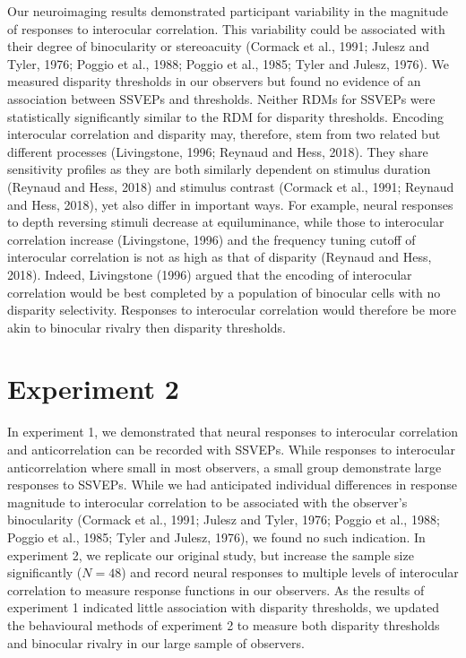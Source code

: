 \documentclass[
  12pt,
]{article}
\begin{document}
Our neuroimaging results demonstrated participant variability in the
magnitude of responses to interocular correlation. This variability
could be associated with their degree of binocularity or stereoacuity
(Cormack et al., 1991; Julesz and Tyler, 1976; Poggio et al., 1988;
Poggio et al., 1985; Tyler and Julesz, 1976). We measured disparity
thresholds in our observers but found no evidence of an association
between SSVEPs and thresholds. Neither RDMs for SSVEPs were
statistically significantly similar to the RDM for disparity thresholds.
Encoding interocular correlation and disparity may, therefore, stem from
two related but different processes (Livingstone, 1996; Reynaud and
Hess, 2018). They share sensitivity profiles as they are both similarly
dependent on stimulus duration (Reynaud and Hess, 2018) and stimulus
contrast (Cormack et al., 1991; Reynaud and Hess, 2018), yet also differ
in important ways. For example, neural responses to depth reversing
stimuli decrease at equiluminance, while those to interocular
correlation increase (Livingstone, 1996) and the frequency tuning cutoff
of interocular correlation is not as high as that of disparity (Reynaud
and Hess, 2018). Indeed, Livingstone (1996) argued that the encoding of
interocular correlation would be best completed by a population of
binocular cells with no disparity selectivity. Responses to interocular
correlation would therefore be more akin to binocular rivalry then
disparity thresholds.

\section{Experiment 2}\label{experiment-2}

In experiment 1, we demonstrated that neural responses to interocular
correlation and anticorrelation can be recorded with SSVEPs. While
responses to interocular anticorrelation where small in most observers,
a small group demonstrate large responses to SSVEPs. While we had
anticipated individual differences in response magnitude to interocular
correlation to be associated with the observer's binocularity (Cormack
et al., 1991; Julesz and Tyler, 1976; Poggio et al., 1988; Poggio et
al., 1985; Tyler and Julesz, 1976), we found no such indication. In
experiment 2, we replicate our original study, but increase the sample
size significantly (\(N = 48\)) and record neural responses to multiple
levels of interocular correlation to measure response functions in our
observers. As the results of experiment 1 indicated little association
with disparity thresholds, we updated the behavioural methods of
experiment 2 to measure both disparity thresholds and binocular rivalry
in our large sample of observers.
\end{document}
